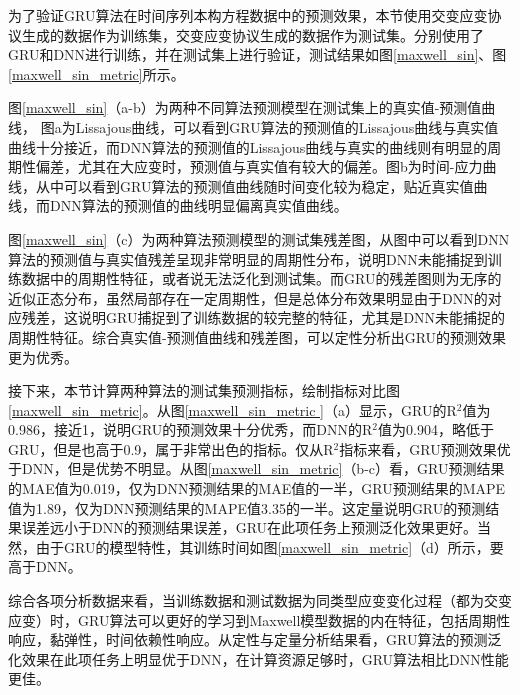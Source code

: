 为了验证GRU算法在时间序列本构方程数据中的预测效果，本节使用交变应变协议生成的数据作为训练集，交变应变协议生成的数据作为测试集。分别使用了GRU和DNN进行训练，并在测试集上进行验证，测试结果如图\ref{maxwell_sin}、图\ref{maxwell_sin_metric}所示。

图\ref{maxwell_sin}（a-b）为两种不同算法预测模型在测试集上的真实值-预测值曲线，
图a为Lissajous曲线，可以看到GRU算法的预测值的Lissajous曲线与真实值曲线十分接近，而DNN算法的预测值的Lissajous曲线与真实的曲线则有明显的周期性偏差，尤其在大应变时，预测值与真实值有较大的偏差。图b为时间-应力曲线，从中可以看到GRU算法的预测值曲线随时间变化较为稳定，贴近真实值曲线，而DNN算法的预测值的曲线明显偏离真实值曲线。

图\ref{maxwell_sin}（c）为两种算法预测模型的测试集残差图，从图中可以看到DNN算法的预测值与真实值残差呈现非常明显的周期性分布，说明DNN未能捕捉到训练数据中的周期性特征，或者说无法泛化到测试集。而GRU的残差图则为无序的近似正态分布，虽然局部存在一定周期性，但是总体分布效果明显由于DNN的对应残差，这说明GRU捕捉到了训练数据的较完整的特征，尤其是DNN未能捕捉的周期性特征。综合真实值-预测值曲线和残差图，可以定性分析出GRU的预测效果更为优秀。


接下来，本节计算两种算法的测试集预测指标，绘制指标对比图\ref{maxwell_sin_metric}。从图\ref{maxwell_sin_metric
}（a）显示，GRU的R$^2$值为0.986，接近1，说明GRU的预测效果十分优秀，而DNN的R$^2$值为0.904，略低于GRU，但是也高于0.9，属于非常出色的指标。仅从R$^2$指标来看，GRU预测效果优于DNN，但是优势不明显。从图\ref{maxwell_sin_metric}（b-c）看，GRU预测结果的MAE值为0.019，仅为DNN预测结果的MAE值的一半，GRU预测结果的MAPE值为1.89，仅为DNN预测结果的MAPE值3.35的一半。这定量说明GRU的预测结果误差远小于DNN的预测结果误差，GRU在此项任务上预测泛化效果更好。当然，由于GRU的模型特性，其训练时间如图\ref{maxwell_sin_metric}（d）所示，要高于DNN。

综合各项分析数据来看，当训练数据和测试数据为同类型应变变化过程（都为交变应变）时，GRU算法可以更好的学习到Maxwell模型数据的内在特征，包括周期性响应，黏弹性，时间依赖性响应。从定性与定量分析结果看，GRU算法的预测泛化效果在此项任务上明显优于DNN，在计算资源足够时，GRU算法相比DNN性能更佳。



